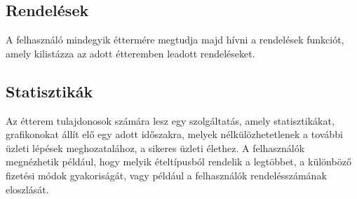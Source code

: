 \subsection{Rendelések}

A felhasználó mindegyik éttermére megtudja majd hívni a rendelések funkciót, amely kilistázza az adott étteremben leadott rendeléseket.

\subsection{Statisztikák}

Az étterem tulajdonosok számára lesz egy szolgáltatás, amely statisztikákat, grafikonokat állít elő egy adott időszakra, melyek nélkülözhetetlenek a további üzleti lépések meghozatalához, a sikeres üzleti élethez. A felhasználók megnézhetik például, hogy melyik ételtípusból rendelik a legtöbbet, a különböző fizetési módok gyakoriságát, vagy például a felhasználók rendelésszámának eloszlását.
